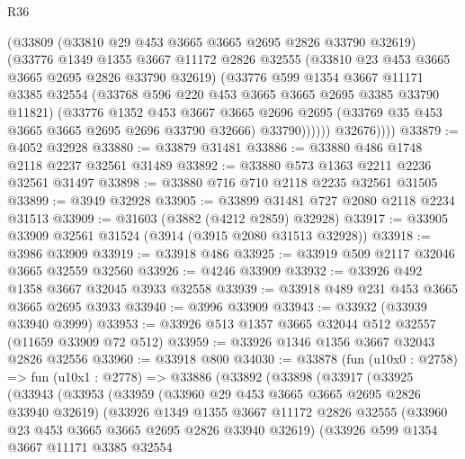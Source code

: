 \begin{lexlean}{R36}
\begin{coremodule}
                (@33809
                  (@33810 @29 @453 @3665 @3665 @2695 @2826 @33790 @32619)
                  (@33776
                    @1349
                    @1355
                    @3667
                    @11172
                    @2826
                    @32555
                    (@33810 @23 @453 @3665 @3665 @2695 @2826 @33790 @32619)
                    (@33776
                      @599
                      @1354
                      @3667
                      @11171
                      @3385
                      @32554
                      (@33768 @596 @220 @453 @3665 @3665 @2695 @3385 @33790 @11821)
                      (@33776
                        @1352
                        @453
                        @3667
                        @3665
                        @2696
                        @2695
                        (@33769 @35 @453 @3665 @3665 @2695 @2696 @33790 @32666)
                        @33790))))))
            @32676))))
@33879 := @4052 @32928
@33880 := @33879 @31481
@33886 := @33880 @486 @1748 @2118 @2237 @32561 @31489
@33892 := @33880 @573 @1363 @2211 @2236 @32561 @31497
@33898 := @33880 @716 @710 @2118 @2235 @32561 @31505
@33899 := @3949 @32928
@33905 := @33899 @31481 @727 @2080 @2118 @2234 @31513
@33909 := @31603 (@3882 (@4212 @2859) @32928)
@33917 := @33905 @33909 @32561 @31524 (@3914 (@3915 @2080 @31513 @32928))
@33918 := @3986 @33909
@33919 := @33918 @486
@33925 := @33919 @509 @2117 @32046 @3665 @32559 @32560
@33926 := @4246 @33909
@33932 := @33926 @492 @1358 @3667 @32045 @3933 @32558
@33939 := @33918 @489 @231 @453 @3665 @3665 @2695 @3933
@33940 := @3996 @33909
@33943 := @33932 (@33939 @33940 @3999)
@33953 := @33926 @513 @1357 @3665 @32044 @512 @32557 (@11659 @33909 @72 @512)
@33959 := @33926 @1346 @1356 @3667 @32043 @2826 @32556
@33960 := @33918 @800
@34030 := @33878
    (fun (u10x0 : @2758) =>
    fun (u10x1 : @2778) =>
    @33886
      (@33892
        (@33898
          (@33917
            (@33925
              (@33943
                (@33953
                  (@33959
                    (@33960 @29 @453 @3665 @3665 @2695 @2826 @33940 @32619)
                    (@33926
                      @1349
                      @1355
                      @3667
                      @11172
                      @2826
                      @32555
                      (@33960 @23 @453 @3665 @3665 @2695 @2826 @33940 @32619)
                      (@33926
                        @599
                        @1354
                        @3667
                        @11171
                        @3385
                        @32554

\end{coremodule}
\end{lexlean}
